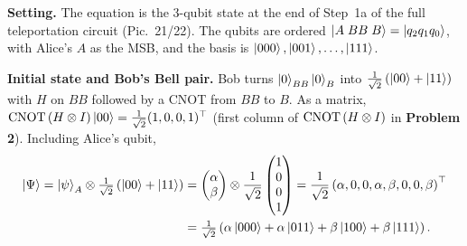 \documentclass[a4paper, 10pt]{article}
\begin{document}
\begin{solution}
	\noindent \textbf{Setting.} The equation is the 3-qubit state at the end of Step~1a of the full teleportation circuit (Pic.~21/22). The qubits are ordered \( \ket{A\;BB\;B} = \ket{q_2 q_1 q_0} \), with Alice's \( A \) as the MSB, and the basis is \( \ket{000}, \ket{001}, \dots, \ket{111} \).

	\noindent \textbf{Initial state and Bob's Bell pair.} Bob turns \( \ket{0}_{BB}\ket{0}_B \) into \( \tfrac{1}{\sqrt{2}}\left(\ket{00} + \ket{11}\right) \) with \( H \) on \( BB \) followed by a CNOT from \( BB \) to \( B \). As a matrix, \( \mathrm{CNOT}\left(H \otimes I\right)\ket{00} = \tfrac{1}{\sqrt{2}}(1, 0, 0, 1)^{\top} \) (first column of \( \mathrm{CNOT}\left(H \otimes I\right) \) in \textbf{Problem 2}). Including Alice's qubit,
	\begin{align*}
		\ket{\Psi} = \ket{\psi}_A \otimes \tfrac{1}{\sqrt{2}}\left(\ket{00} + \ket{11}\right)
		 & = \begin{pmatrix} \alpha \\ \beta \end{pmatrix} \otimes \frac{1}{\sqrt{2}}\begin{pmatrix} 1 \\ 0 \\ 0 \\ 1 \end{pmatrix}
		= \frac{1}{\sqrt{2}}\left(\alpha, 0, 0, \alpha, \beta, 0, 0, \beta\right)^{\top}                                                 \\
		 & = \tfrac{1}{\sqrt{2}}\left(\alpha\ket{000} + \alpha\ket{011} + \beta\ket{100} + \beta\ket{111}\right).
	\end{align*}


\end{solution}
\end{document}
